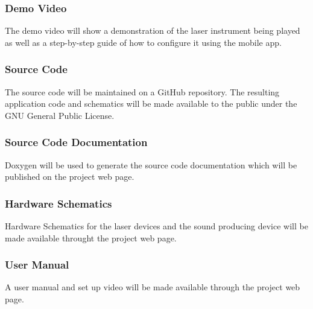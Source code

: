 \subsubsection{Demo Video}
The demo video will show a demonstration of the laser instrument being played as well as a step-by-step guide of how to configure it using the mobile app.

\subsubsection{Source Code}
The source code will be maintained on a GitHub repository. The resulting application code and schematics will be made available to the public under the GNU General Public License.

\subsubsection{Source Code Documentation}
Doxygen will be used to generate the source code documentation which will be published on the project web page.

\subsubsection{Hardware Schematics}
Hardware Schematics for the laser devices and the sound producing device will be made available throught the project web page.

\subsubsection{User Manual}
A user manual and set up video will be made available through the project web page.
